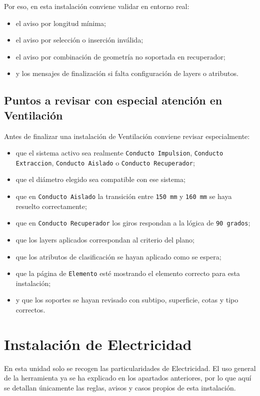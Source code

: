 \documentclass[12pt,a4paper]{article}
\begin{document}
Por eso, en esta instalación conviene validar en entorno real:

\begin{itemize}
\item el aviso por longitud mínima;
\item el aviso por selección o inserción inválida;
\item el aviso por combinación de geometría no soportada en recuperador;
\item y los mensajes de finalización si falta configuración de layers o atributos.
\end{itemize}

\subsection{Puntos a revisar con especial atención en Ventilación}

Antes de finalizar una instalación de Ventilación conviene revisar especialmente:

\begin{itemize}
\item que el sistema activo sea realmente \texttt{Conducto Impulsion}, \texttt{Conducto Extraccion}, \texttt{Conducto Aislado} o \texttt{Conducto Recuperador};
\item que el diámetro elegido sea compatible con ese sistema;
\item que en \texttt{Conducto Aislado} la transición entre \texttt{150 mm} y \texttt{160 mm} se haya resuelto correctamente;
\item que en \texttt{Conducto Recuperador} los giros respondan a la lógica de \texttt{90 grados};
\item que los layers aplicados correspondan al criterio del plano;
\item que los atributos de clasificación se hayan aplicado como se espera;
\item que la página de \texttt{Elemento} esté mostrando el elemento correcto para esta instalación;
\item y que los soportes se hayan revisado con subtipo, superficie, cotas y tipo correctos.
\end{itemize}

\section{Instalación de Electricidad}

En esta unidad solo se recogen las particularidades de Electricidad. El uso general de la herramienta ya se ha explicado en los apartados anteriores, por lo que aquí se detallan únicamente las reglas, avisos y casos propios de esta instalación.
\end{document}
